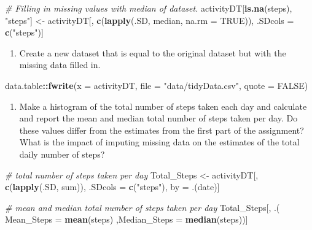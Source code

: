 \documentclass[
]{article}
\newenvironment{Shaded}{\begin{snugshade}}{\end{snugshade}}
\newcommand{\CommentTok}[1]{\textcolor[rgb]{0.56,0.35,0.01}{\textit{#1}}}
\newcommand{\DataTypeTok}[1]{\textcolor[rgb]{0.13,0.29,0.53}{#1}}
\newcommand{\KeywordTok}[1]{\textcolor[rgb]{0.13,0.29,0.53}{\textbf{#1}}}
\newcommand{\NormalTok}[1]{#1}
\newcommand{\OperatorTok}[1]{\textcolor[rgb]{0.81,0.36,0.00}{\textbf{#1}}}
\newcommand{\OtherTok}[1]{\textcolor[rgb]{0.56,0.35,0.01}{#1}}
\newcommand{\StringTok}[1]{\textcolor[rgb]{0.31,0.60,0.02}{#1}}
\providecommand{\tightlist}{%
  \setlength{\itemsep}{0pt}\setlength{\parskip}{0pt}}
\begin{document}
\begin{Shaded}
\begin{Highlighting}[]
\CommentTok{# Filling in missing values with median of dataset. }
\NormalTok{activityDT[}\KeywordTok{is.na}\NormalTok{(steps), }\StringTok{"steps"}\NormalTok{] <-}\StringTok{ }\NormalTok{activityDT[, }\KeywordTok{c}\NormalTok{(}\KeywordTok{lapply}\NormalTok{(.SD, median, }\DataTypeTok{na.rm =} \OtherTok{TRUE}\NormalTok{)), .SDcols =}\StringTok{ }\KeywordTok{c}\NormalTok{(}\StringTok{"steps"}\NormalTok{)]}
\end{Highlighting}
\end{Shaded}

\begin{enumerate}
\def\labelenumi{\arabic{enumi}.}
\setcounter{enumi}{2}
\tightlist
\item
  Create a new dataset that is equal to the original dataset but with
  the missing data filled in.
\end{enumerate}

\begin{Shaded}
\begin{Highlighting}[]
\NormalTok{data.table}\OperatorTok{::}\KeywordTok{fwrite}\NormalTok{(}\DataTypeTok{x =}\NormalTok{ activityDT, }\DataTypeTok{file =} \StringTok{"data/tidyData.csv"}\NormalTok{, }\DataTypeTok{quote =} \OtherTok{FALSE}\NormalTok{)}
\end{Highlighting}
\end{Shaded}

\begin{enumerate}
\def\labelenumi{\arabic{enumi}.}
\setcounter{enumi}{3}
\tightlist
\item
  Make a histogram of the total number of steps taken each day and
  calculate and report the mean and median total number of steps taken
  per day. Do these values differ from the estimates from the first part
  of the assignment? What is the impact of imputing missing data on the
  estimates of the total daily number of steps?
\end{enumerate}

\begin{Shaded}
\begin{Highlighting}[]
\CommentTok{# total number of steps taken per day}
\NormalTok{Total_Steps <-}\StringTok{ }\NormalTok{activityDT[, }\KeywordTok{c}\NormalTok{(}\KeywordTok{lapply}\NormalTok{(.SD, sum)), .SDcols =}\StringTok{ }\KeywordTok{c}\NormalTok{(}\StringTok{"steps"}\NormalTok{), by =}\StringTok{ }\NormalTok{.(date)] }

\CommentTok{# mean and median total number of steps taken per day}
\NormalTok{Total_Steps[, .( }\DataTypeTok{Mean_Steps =} \KeywordTok{mean}\NormalTok{(steps)}
\NormalTok{                ,}\DataTypeTok{Median_Steps =} \KeywordTok{median}\NormalTok{(steps))]}
\end{Highlighting}
\end{Shaded}
\end{document}
